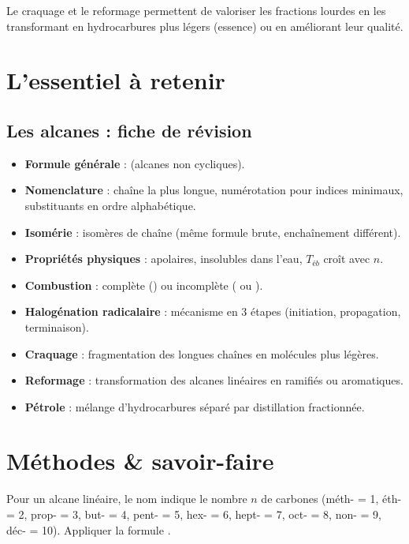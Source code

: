 \begin{remarque}
Le craquage et le reformage permettent de valoriser les fractions lourdes en les transformant en hydrocarbures plus légers (essence) ou en améliorant leur qualité.
\end{remarque}

\section{L'essentiel à retenir}

\begin{synthese}
\subsection*{Les alcanes : fiche de révision}
\begin{itemize}
    \item \textbf{Formule générale} :  (alcanes non cycliques).
    \item \textbf{Nomenclature} : chaîne la plus longue, numérotation pour indices minimaux, substituants en ordre alphabétique.
    \item \textbf{Isomérie} : isomères de chaîne (même formule brute, enchaînement différent).
    \item \textbf{Propriétés physiques} : apolaires, insolubles dans l'eau, \(T_{éb}\) croît avec \(n\).
    \item \textbf{Combustion} : complète () ou incomplète ( ou ).
    \item \textbf{Halogénation radicalaire} : mécanisme en 3 étapes (initiation, propagation, terminaison).
    \item \textbf{Craquage} : fragmentation des longues chaînes en molécules plus légères.
    \item \textbf{Reformage} : transformation des alcanes linéaires en ramifiés ou aromatiques.
    \item \textbf{Pétrole} : mélange d'hydrocarbures séparé par distillation fractionnée.
\end{itemize}
\end{synthese}

\section{Méthodes \& savoir-faire}

Pour un alcane linéaire, le nom indique le nombre \(n\) de carbones (méth- = 1, éth- = 2, prop- = 3, but- = 4, pent- = 5, hex- = 6, hept- = 7, oct- = 8, non- = 9, déc- = 10). Appliquer la formule .

